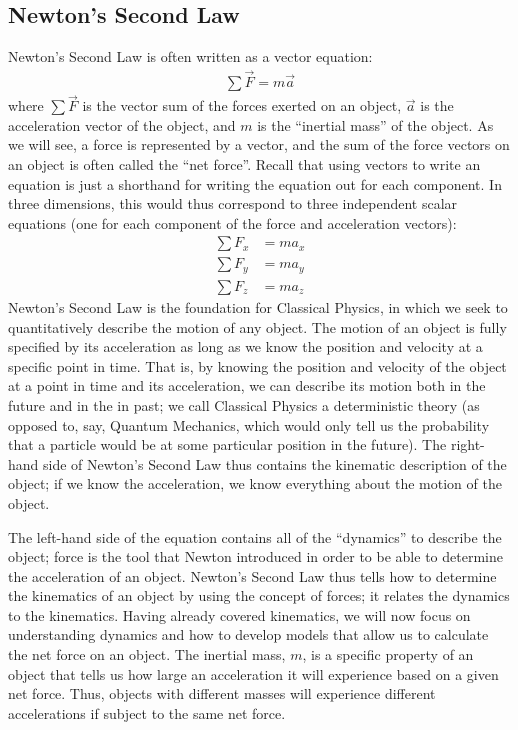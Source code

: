 \subsection{Newton's Second Law}
Newton's Second Law is often written as a vector equation:
\begin{align*}
\sum \vec F = m\vec a
\end{align*}
where $\sum \vec F$ is the vector sum of the forces exerted on an object, $\vec a$ is the acceleration vector of the object, and $m$ is the ``inertial mass'' of the object. As we will see, a force is represented by a vector, and the sum of the force vectors on an object is often called the ``net force''. Recall that using vectors to write an equation is just a shorthand for writing the equation out for each component. In three dimensions, this would thus correspond to three independent scalar equations (one for each component of the force and acceleration vectors):
\begin{align*}
\sum F_x &= ma_x \\
\sum F_y &= ma_y \\
\sum F_z &= ma_z
\end{align*}
Newton's Second Law is the foundation for Classical Physics, in which we seek to quantitatively describe the motion of any object. The motion of an object is fully specified by its acceleration as long as we know the position and velocity at a specific point in time. That is, by knowing the position and velocity of the object at a point in time and its acceleration, we can describe its motion both in the future and in the in past; we call Classical Physics a deterministic theory (as opposed to, say, Quantum Mechanics, which would only tell us the probability that a particle would be at some particular position in the future). The right-hand side of Newton's Second Law thus contains the kinematic description of the object; if we know the acceleration, we know everything about the motion of the object.

The left-hand side of the equation contains all of the ``dynamics'' to describe the object; force is the tool that Newton introduced in order to be able to determine the acceleration of an object. Newton's Second Law thus tells how to determine the kinematics of an object by using the concept of forces; it relates the dynamics to the kinematics. Having already covered kinematics, we will now focus on understanding dynamics and how to develop models that allow us to calculate the net force on an object. The inertial mass, $m$, is a specific property of an object that tells us how large an acceleration it will experience based on a given net force. Thus, objects with different masses will experience different accelerations if subject to the same net force.

